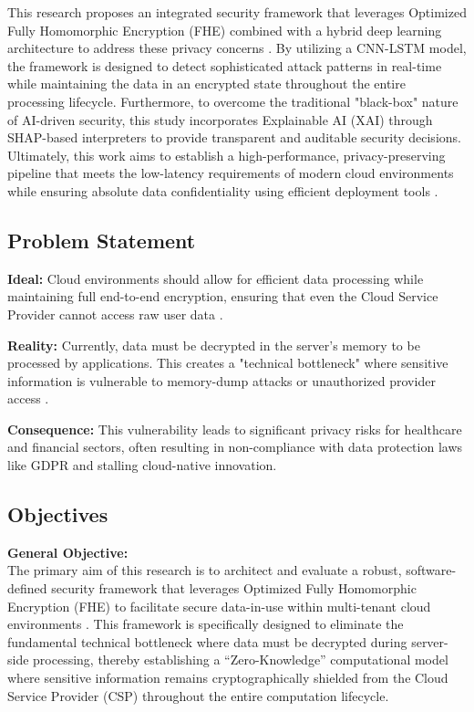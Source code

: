 \documentclass[12pt, a4paper]{article}
\begin{document}
This research proposes an integrated security framework that leverages Optimized Fully Homomorphic Encryption (FHE) combined with a hybrid deep learning architecture to address these privacy concerns \cite{li2023aisecurity}. By utilizing a CNN-LSTM model, the framework is designed to detect sophisticated attack patterns in real-time while maintaining the data in an encrypted state throughout the entire processing lifecycle. Furthermore, to overcome the traditional "black-box" nature of AI-driven security, this study incorporates Explainable AI (XAI) through SHAP-based interpreters to provide transparent and auditable security decisions. Ultimately, this work aims to establish a high-performance, privacy-preserving pipeline that meets the low-latency requirements of modern cloud environments while ensuring absolute data confidentiality using efficient deployment tools \cite{alam2024fastapi}.

\subsection{Problem Statement} 
\textbf{Ideal:} Cloud environments should allow for efficient data processing while maintaining full end-to-end encryption, ensuring that even the Cloud Service Provider cannot access raw user data \cite{mell2011nist}.

\textbf{Reality:} Currently, data must be decrypted in the server's memory to be processed by applications. This creates a "technical bottleneck" where sensitive information is vulnerable to memory-dump attacks or unauthorized provider access \cite{bhushan2022cloudsecurity}.

\textbf{Consequence:} This vulnerability leads to significant privacy risks for healthcare and financial sectors, often resulting in non-compliance with data protection laws like GDPR \cite{gdpr2018} and stalling cloud-native innovation.

\subsection{Objectives}

\textbf{General Objective:} \\
The primary aim of this research is to architect and evaluate a robust, software-defined security framework that leverages Optimized Fully Homomorphic Encryption (FHE) to facilitate secure data-in-use within multi-tenant cloud environments \cite{zhang2023cloudsecurity}. This framework is specifically designed to eliminate the fundamental technical bottleneck where data must be decrypted during server-side processing, thereby establishing a ``Zero-Knowledge'' computational model where sensitive information remains cryptographically shielded from the Cloud Service Provider (CSP) throughout the entire computation lifecycle.
\end{document}
